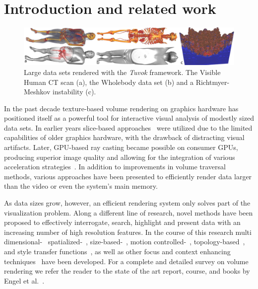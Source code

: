 \section{Introduction and related work}

\begin{figure}
	\includegraphics[width=\linewidth]{images/arch/vh-rm}

  \caption{Large data sets rendered with the \textit{Tuvok} framework.
  The Visible Human CT scan (a), the Wholebody data set (b) and a
  Richtmyer-Meshkov instability (c).}
	\label{fig:tvktease}
\end{figure}

In the past decade texture-based volume rendering on graphics hardware
has positioned itself as a powerful tool for interactive visual
analysis of modestly sized data sets. In earlier years slice-based
approaches~\cite{Cullip:1993:AVRW, Cabral:1994:AVRA} were utilized
due to the limited capabilities of older graphics hardware, with the
drawback of distracting visual artifacts. Later, GPU-based ray casting
became possible on consumer GPUs, producing superior image quality
and allowing for the integration of various acceleration
strategies~\cite{Krueger:2003:ATGV}.  In addition to improvements in
volume traversal methods, various approaches have been presented to
efficiently render data larger than the video or even the system's main
memory.

As data sizes grow, however, an efficient rendering system only solves
part of the visualization problem. Along a different line of research,
novel methods have been proposed to effectively interrogate, search,
highlight and present data with an increasing number of high resolution
features. In the course of this research multi
dimensional-~\cite{Kniss:2005:Multidim}
spatialized-~\cite{Roettger:2005:Spatialized},
size-based-~\cite{Correa:2008:Size-based}, motion
controlled-~\cite{Correa:2005:Motion},
topology-based~\cite{Weber:2007:Topology},
and style transfer functions~\cite{Bruckner:2007:Style}, as well as
other focus and context enhancing
techniques~\cite{Viola:2005:Illustrative, Wang:2005:Lens,
Krueger:2006:ClearView} have been developed. For a complete and
detailed survey on volume rendering we refer the reader to the state of
the art report, course, and books by Engel et
al.~\cite{Engel:2002:IHQV, Engel:2004:RTVG, Engel:2006:RTVG}.

